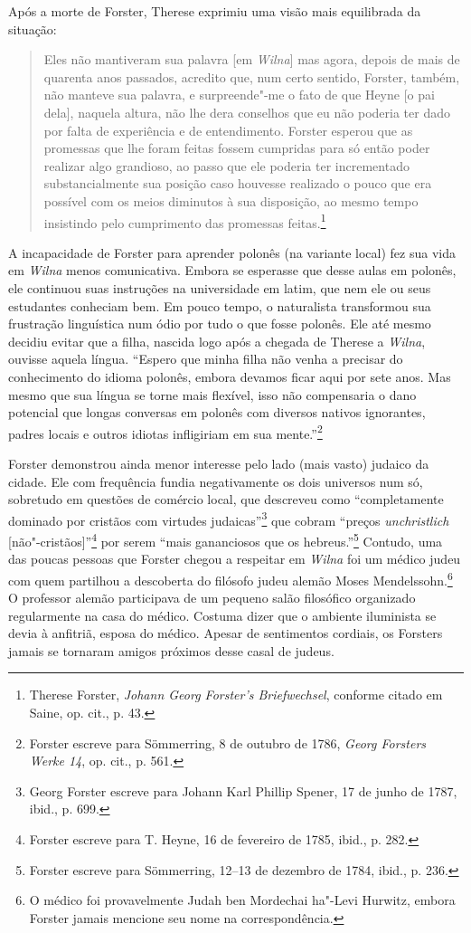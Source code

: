 Após a morte de Forster, Therese exprimiu uma visão mais equilibrada da
situação:

\begin{quote}
Eles não mantiveram sua palavra {[}em \textit{Wilna}{]} mas agora, depois de mais
de quarenta anos passados, acredito que, num certo sentido, Forster,
também, não manteve sua palavra, e surpreende"-me o fato de que Heyne
{[}o pai dela{]}, naquela altura, não lhe dera conselhos que eu não
poderia ter dado por falta de experiência e de entendimento. Forster
esperou que as promessas que lhe foram feitas fossem cumpridas para só
então poder realizar algo grandioso, ao passo que ele poderia ter
incrementado substancialmente sua posição caso houvesse realizado o
pouco que era possível com os meios diminutos à sua disposição, ao mesmo
tempo insistindo pelo cumprimento das promessas feitas.\footnote{Therese Forster, \textit{Johann Georg Forster's Briefwechsel}, conforme citado em Saine, op. cit., p. 43.} 
\end{quote}

A incapacidade de Forster para aprender polonês (na variante local) fez
sua vida em \textit{Wilna} menos comunicativa. Embora se esperasse que desse
aulas em polonês, ele continuou suas instruções na universidade em
latim, que nem ele ou seus estudantes conheciam bem. Em pouco tempo, o
naturalista transformou sua frustração linguística num ódio por tudo o
que fosse polonês. Ele até mesmo decidiu evitar que a filha, nascida
logo após a chegada de Therese a \textit{Wilna}, ouvisse aquela língua. ``Espero
que minha filha não venha a precisar do conhecimento do idioma polonês,
embora devamos ficar aqui por sete anos. Mas mesmo que sua língua se
torne mais flexível, isso não compensaria o dano potencial que longas
conversas em polonês com diversos nativos ignorantes, padres locais e
outros idiotas infligiriam em sua mente.''\footnote{Forster escreve para Sömmerring, 8 de outubro de 1786, \textit{Georg Forsters Werke 14}, op. cit., p. 561.}

Forster demonstrou ainda menor interesse pelo lado (mais vasto) judaico
da cidade. Ele com frequência fundia negativamente os dois universos num
só, sobretudo em questões de comércio local, que descreveu como
``completamente dominado por cristãos com virtudes judaicas''\footnote{Georg Forster escreve para Johann Karl Phillip Spener, 17 de junho de 1787, ibid., p. 699.} que cobram ``preços \textit{unchristlich} {[}não"-cristãos{]}''\footnote{Forster escreve para T. Heyne, 16 de fevereiro de 1785, ibid., p. 282.} por serem ``mais gananciosos que os hebreus.''\footnote{Forster escreve para Sömmerring, 12--13 de dezembro de 1784, ibid., p. 236.} Contudo, uma das poucas pessoas que Forster chegou a respeitar em \textit{Wilna} foi um médico judeu com quem partilhou a
descoberta do filósofo judeu alemão Moses Mendelssohn.\footnote{O médico foi provavelmente Judah ben Mordechai ha"-Levi Hurwitz, embora Forster jamais mencione seu nome na correspondência.} O professor alemão participava de um pequeno salão filosófico organizado regularmente na
casa do médico. Costuma dizer que o ambiente iluminista se devia à
anfitriã, esposa do médico. Apesar de sentimentos cordiais, os Forsters
jamais se tornaram amigos próximos desse casal de judeus.


